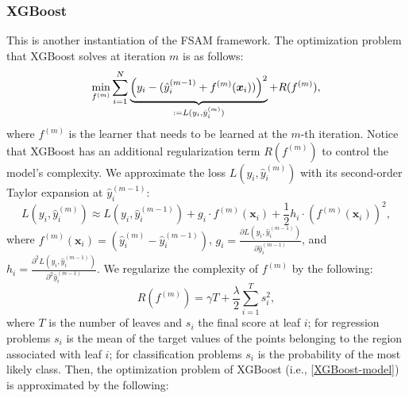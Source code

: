     \subsubsection{XGBoost}
        This is another instantiation of the FSAM framework.
        The optimization problem that XGBoost solves at iteration $m$ is as follows:
            \begin{equation}\label{XGBoost-model}
                \min_{f^{(m)}} \sum_{i=1}^{N}{
                    \underbrace{\left( y_i - (\hat{y}^{(m-1)}_i + f^{(m)}(\bm{x}_i)) \right)^2}_{:=L(y_i, \hat{y}_i^{(m)}) } + R(f^{(m)}),
                }
            \end{equation}
        where $f^{(m)}$ is the learner that needs to be learned at the $m$-th iteration.
        Notice that XGBoost has an additional regularization term $R(f^{(m)})$ to control the model's complexity.
        We approximate the loss $L(y_i, \hat{y}_i^{(m)})$ with its second-order Taylor expansion at $\hat{y}^{(m-1)}_i$:
            \begin{equation}
                L(y_i, \hat{y}_i^{(m)}) \approx L(y_i, \hat{y}^{(m-1)}_i) + g_i \cdot f^{(m)}(\bm{x}_i) + \frac{1}{2} h_i \cdot (f^{(m)}(\bm{x}_i))^2,
            \end{equation}
        where $f^{(m)}(\bm{x}_i) = (\hat{y}_i^{(m)} - \hat{y}_i^{(m-1)})$, $g_i = \frac{\partial L(y_i, \hat{y}_i^{(m-1)})}{\partial \hat{y}_i^{(m-1)} }$, and $h_i = \frac{\partial^2 L(y_i, \hat{y}_i^{(m-1)})}{\partial^2 \hat{y}_i^{(m-1)} }$.
        We regularize the complexity of $f^{(m)}$ by the following:
            \begin{equation}
                R(f^{(m)}) = \gamma T + \frac{\lambda}{2}\sum_{i=1}^{T}{s_i^2},
            \end{equation}
        where $T$ is the number of leaves and $s_i$ the final score at leaf $i$; for regression problems $s_i$ is the mean of the target values of the points belonging to the region associated with leaf $i$; for classification problems $s_i$ is the probability of the most likely class.
        Then, the optimization problem of XGBoost (i.e., \eqref{XGBoost-model}) is approximated by the following:
